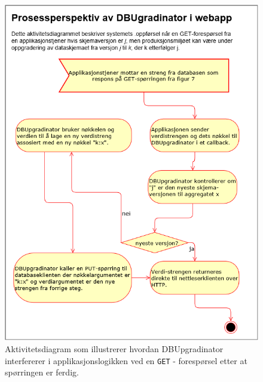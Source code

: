 \begin{figure}[!ht]
    \centering
    \includegraphics[scale=0.6]{fig/dbupgradinator-prosess-2.png}
    \caption{Aktivitetsdiagram som illustrerer hvordan DBUpgradinator interfererer i applikasjonslogikken ved en \texttt{GET} - forespørsel etter at spørringen er ferdig.}
    \label{fig8}
\end{figure}

\newpage

